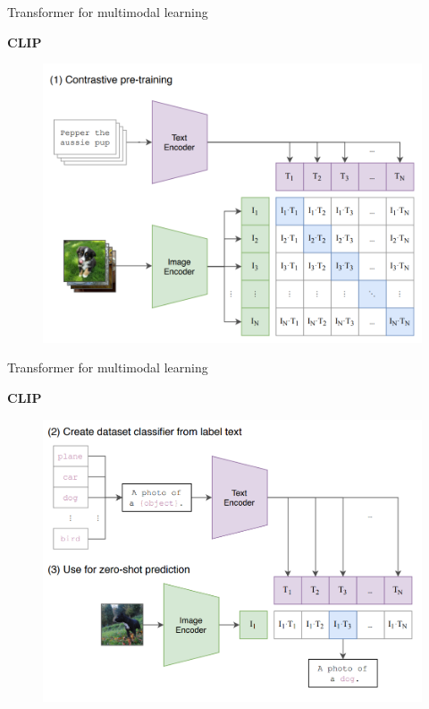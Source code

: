 
\begin{vbframe}{Transformer for multimodal learning}

\vfill

\textbf{CLIP}

\begin{figure}
	\centering
		\includegraphics[width=.7\textwidth]{figure/clip1.png}\\ 
\end{figure}

\vfill

\end{vbframe}


\begin{vbframe}{Transformer for multimodal learning}

\vfill

\textbf{CLIP}

\begin{figure}
	\centering
		\includegraphics[width=.7\textwidth]{figure/clip2.png}\\ 
\end{figure}

\vfill

\end{vbframe}

